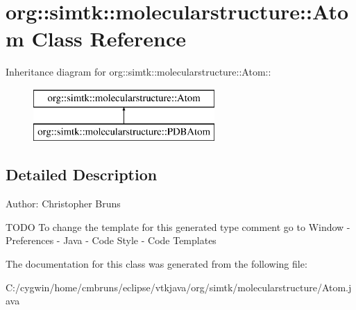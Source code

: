 \section{org::simtk::molecularstructure::Atom Class Reference}
\label{classorg_1_1simtk_1_1molecularstructure_1_1_atom}
Inheritance diagram for org::simtk::molecularstructure::Atom::\begin{figure}[H]
\begin{center}
\leavevmode
\includegraphics[height=2cm]{classorg_1_1simtk_1_1molecularstructure_1_1_atom}
\end{center}
\end{figure}


\subsection{Detailed Description}
\begin{Desc}
\item[Author:]Christopher Bruns\end{Desc}
TODO To change the template for this generated type comment go to Window - Preferences - Java - Code Style - Code Templates 



The documentation for this class was generated from the following file:\begin{CompactItemize}
\item 
C:/cygwin/home/cmbruns/eclipse/vtkjava/org/simtk/molecularstructure/Atom.java\end{CompactItemize}
